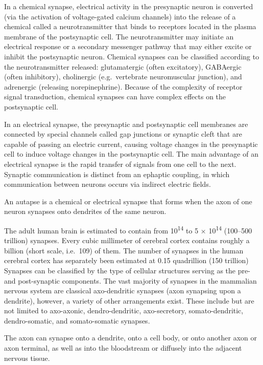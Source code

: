 \documentclass[]{book}
\begin{document}
In a chemical synapse, electrical activity in the presynaptic neuron is converted (via the activation of voltage-gated calcium channels) into the release of a chemical called a neurotransmitter that binds to receptors located in the plasma membrane of the postsynaptic cell. The neurotransmitter may initiate an electrical response or a secondary messenger pathway that may either excite or inhibit the postsynaptic neuron. Chemical synapses can be classified according to the neurotransmitter released: glutamatergic (often excitatory), GABAergic (often inhibitory), cholinergic (e.g.~vertebrate neuromuscular junction), and adrenergic (releasing norepinephrine). Because of the complexity of receptor signal transduction, chemical synapses can have complex effects on the postsynaptic cell.

In an electrical synapse, the presynaptic and postsynaptic cell membranes are connected by special channels called gap junctions or synaptic cleft that are capable of passing an electric current, causing voltage changes in the presynaptic cell to induce voltage changes in the postsynaptic cell. The main advantage of an electrical synapse is the rapid transfer of signals from one cell to the next.
Synaptic communication is distinct from an ephaptic coupling, in which communication between neurons occurs via indirect electric fields.

An autapse is a chemical or electrical synapse that forms when the axon of one neuron synapses onto dendrites of the same neuron.

The adult human brain is estimated to contain from 10\textsuperscript{14} to 5 × 10\textsuperscript{14} (100--500 trillion) synapses. Every cubic millimeter of cerebral cortex contains roughly a billion (short scale, i.e.~109) of them. The number of synapses in the human cerebral cortex has separately been estimated at 0.15 quadrillion (150 trillion)
Synapses can be classified by the type of cellular structures serving as the pre- and post-synaptic components. The vast majority of synapses in the mammalian nervous system are classical axo-dendritic synapses (axon synapsing upon a dendrite), however, a variety of other arrangements exist. These include but are not limited to axo-axonic, dendro-dendritic, axo-secretory, somato-dendritic, dendro-somatic, and somato-somatic synapses.

The axon can synapse onto a dendrite, onto a cell body, or onto another axon or axon terminal, as well as into the bloodstream or diffusely into the adjacent nervous tissue.
\end{document}
